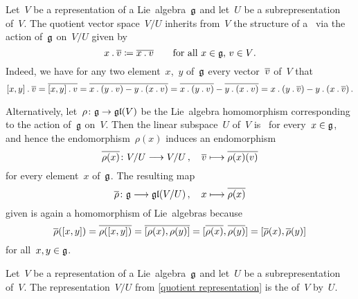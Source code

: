 \begin{example}
  \label{quotient representation}
  Let~$V$ be a representation of a Lie~algebra~$\glie$ and let~$U$ be a subrepresentation of~$V$.
  The quotient vector space~$V/U$ inherits from~$V$ the structure of a~{\representation{$\glie$}} via the action of~$\glie$ on~$V/U$ given by
  \[
    x \mathbin{.} \overline{v}
    \coloneqq
    \overline{x \mathbin{.} v}
    \qquad
    \text{for all~$x \in \mathfrak{g}$,~$v \in V$}.
  \]
  Indeed, we have for any two element~$x$,~$y$ of~$\glie$ every vector~$\overline{v}$ of~$V$ that
  \[
    [x,y] \mathbin{.} \overline{v}
    =
    \overline{[x,y] \mathbin{.} v}
    =
    \overline{x \mathbin{.} (y \mathbin{.} v) - y \mathbin{.} (x \mathbin{.} v)}
    =
    \overline{x \mathbin{.} (y \mathbin{.} v)} - \overline{y \mathbin{.} (x \mathbin{.} v)}
    =
    x \mathbin{.} (y \mathbin{.} \overline{v}) - y \mathbin{.} (x \mathbin{.} \overline{v}) \,.
  \]
  
  Alternatively, let~$\rho \colon \glie \to \gllie(V)$ be the Lie~algebra homomorphism corresponding to the action of~$\glie$ on~$V$.
  Then the linear subspace~$U$ of~$V$ is~{} for every~$x \in \mathfrak{g}$, and hence the endomorphism~$\rho(x)$ induces an endomorphism
  \[
    \induced{\rho(x)}
    \colon
    V/U
    \to
    V/U \,,
    \quad
    \class{v}
    \mapsto
    \class{\rho(x)(v)}
  \]
  for every element~$x$ of~$\glie$.
  The resulting map
  \[
    \induced{\rho}
    \colon
    \glie
    \to
    \gllie(V/U) \,,
    \quad
    x
    \mapsto
    \induced{\rho(x)}
  \]
  given is again a homomorphism of Lie~algebras because
  \[
    \overline{\rho}([x,y])
    =
    \overline{\rho([x,y])}
    =
    \overline{[\rho(x), \rho(y)]}
    =
    [\overline{\rho(x)}, \overline{\rho(y)}]
    =
    [\overline{\rho}(x), \overline{\rho}(y)]
  \]
  for all~$x, y \in \mathfrak{g}$.
\end{example}


\begin{definition}
  Let~$V$ be a representation of a Lie~algebra~$\glie$ and let~$U$ be a subrepresentation of~$V$.
  The representation~$V/U$ from \cref{quotient representation} is the  of~$V$ by~$U$.
\end{definition}


